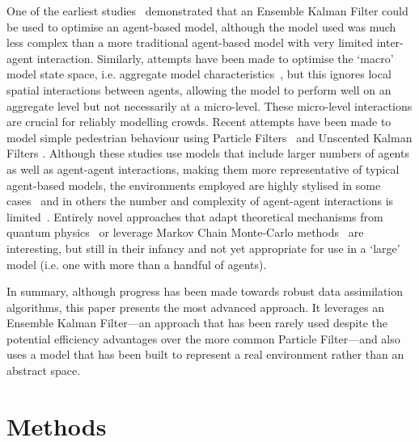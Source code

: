 \documentclass{article}
\begin{document}
One of the earliest studies~\cite{ward_dynamic_2016} demonstrated that an Ensemble Kalman Filter could be used to optimise an agent-based model, although the model used was much less complex than a more traditional agent-based model with very limited inter-agent interaction. Similarly, attempts have been made to optimise the `macro' model state space, i.e. aggregate model characteristics~\cite{cocucci_inference_2022}, but this ignores local spatial interactions between agents, allowing the model to perform well on an aggregate level but not necessarily at a micro-level. These micro-level interactions are crucial for reliably modelling crowds. Recent attempts have been made to model simple pedestrian behaviour using Particle Filters~\cite{wang_data_2015, malleson_simulating_2020, ternes_data_2021} and Unscented Kalman Filters \cite{clay_realtime_2020, clay_realtime_2021}. Although these studies use models that include larger numbers of agents as well as agent-agent interactions, making them more representative of typical agent-based models, the environments employed are highly stylised in some cases~\citep{ternes_data_2021, clay_realtime_2020, clay_realtime_2021} and in others the number and complexity of agent-agent interactions is limited~\cite{wang_data_2015}. Entirely novel approaches that adapt theoretical mechanisms from quantum physics~\cite{tang_data_2019} or leverage Markov Chain Monte-Carlo methods~\cite{tang_data_2022} are interesting, but still in their infancy and not yet appropriate for use in a `large' model (i.e. one with more than a handful of agents). 

In summary, although progress has been made towards robust data assimilation algorithms, this paper presents the most advanced approach. It leverages an Ensemble Kalman Filter---an approach that has been rarely used despite the potential efficiency advantages over the more common Particle Filter---and also uses a model that has been built to represent a real environment rather than an abstract space.


\section{Methods}\label{sec:methods}

\end{document}
